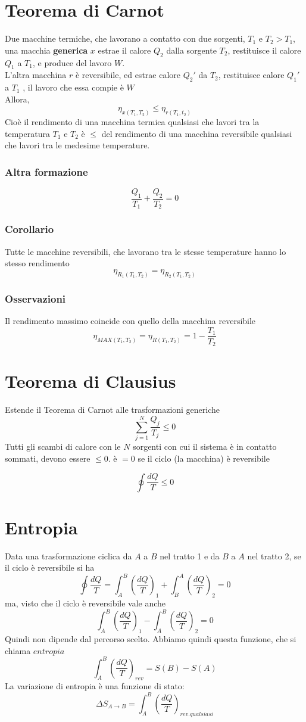\documentclass[a4paper]{report}
\begin{document}
  \section{Teorema di Carnot}
  Due macchine termiche, che lavorano a contatto con due sorgenti, $T_1$ e $T_2 > T_1$, una macchia \textbf{generica} $x$ estrae il calore $Q_2$ dalla sorgente $T_2$, restituisce il calore $Q_1$ a $T_1$, e produce del lavoro $W$. \\
  L'altra macchina $r$ è reversibile, ed estrae calore $Q_2'$ da $T_2$, restituisce calore $Q_1'$ a $T_1$ , il lavoro che essa compie è $W$\\
  Allora,
  \[ \eta_{x(T_1, T_2)}  \leq \eta_{r(T_1, t_2)} \]
  Cioè il rendimento di una macchina termica qualsiasi che lavori tra la temperatura $T_1$ e $T_2$ è $\leq$ del rendimento di una macchina reversibile qualsiasi che lavori tra le medesime temperature.
  \subsubsection{Altra formazione}
  \[ \frac{Q_1}{T_1} + \frac{Q_2}{T_2} = 0 \]

  \subsubsection{Corollario}
  Tutte le macchine reversibili, che lavorano tra le stesse temperature hanno lo stesso rendimento
  \[ \eta_{R_1(T_1, T_2)} = \eta_{R_2(T_1, T_2)} \]
  \subsubsection{Osservazioni}
  Il rendimento massimo coincide con quello della macchina reversibile
  \[ \eta_{MAX(T_1,T_2)} = \eta_{R(T_1,T_2)} = 1-\frac{T_1}{T_2} \]

  \section{Teorema di Clausius}
  Estende il Teorema di Carnot alle trasformazioni generiche
  \[ \sum_{j=1}^N \frac{Q_j}{T_j} \leq 0 \]
  Tutti gli scambi di calore con le $N$ sorgenti con cui il sistema è in contatto sommati, devono essere $\leq 0$. è $=0$ se il ciclo (la macchina) è reversibile

  \[ \oint \frac{dQ}{T} \leq 0 \]

  \section{Entropia}
  Data una trasformazione ciclica da $A$ a $B$ nel tratto 1 e da $B$ a $A$ nel tratto 2, se il ciclo è reversibile si ha
  \[ \oint \frac{dQ}{T} = \int_A^B (\frac{dQ}{T})_1 + \int_B^A (\frac{dQ}{T})_2 = 0\]
  ma, visto che il ciclo è reversibile vale anche
  \[ \int_A^B (\frac{dQ}{T})_1 - \int_A^B (\frac{dQ}{T})_2 = 0\]
  Quindi non dipende dal percorso scelto. Abbiamo quindi questa funzione, che si chiama $entropia$
  \[ \int_A^B (\frac{dQ}{T})_{rev} = S(B) -S(A) \]
  La variazione di entropia è una funzione di stato:
  \[ \Delta S_{A \rightarrow B} = \int_A^B (\frac{dQ}{T})_{rev. qualsiasi} \]
\end{document}
